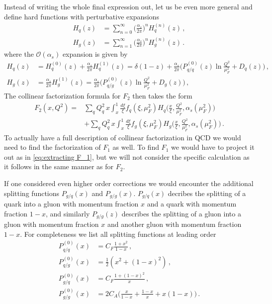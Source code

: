 Instead of writing the whole final expression out, let us be even more general and define hard functions with perturbative expansions
\begin{align}
    H_{q}(z)&=\sum_{n=0}^{\infty}\Big(\frac{\alpha_s}{2\pi}\Big)^{n}H_{q}^{(n)}(z)\,,
    \\
    H_{g}(z)&=\sum_{n=1}^{\infty}\Big(\frac{\alpha_s}{2\pi}\Big)^{n}H_{g}^{(n)}(z)\,.
\end{align}
where the $\mathcal{O}(\alpha_s)$ expansion is given by
\begin{align}
    H_{q}(z)&=H_{q}^{(0)}(z)+\frac{\alpha_s}{2\pi}H_{q}^{(1)}(z)=\delta(1-z)+\frac{\alpha_s}{2\pi}\Big(P_{q/q}^{(0)}(z)\ln{\frac{Q^{2}}{\mu_{F}^{2}}}+D_{q}(z)\Big)\,,
    \\
    H_{g}(z)&=\frac{\alpha_s}{2\pi}H_{g}^{(1)}(z)=\frac{\alpha_s}{2\pi}\Big(P_{q/g}^{(0)}(z)\ln{\frac{Q^{2}}{\mu_{F}^{2}}}+D_{g}(z)\Big)\,,
\end{align}
The collinear factorization formula for $F_2$ then takes the form
\begin{align}
    F_{2}(x,Q^{2})=&\sum_{q}Q_{q}^{2}\,x\int_{x}^{1}\frac{d\xi}{\xi}f_{q}(\xi,\mu_{F}^{2})H_{q}\big(\frac{x}{\xi},\frac{Q^{2}}{\mu_{F}^{2}},\alpha_{s}(\mu_{F}^{2})\big)\nonumber
    \\
    &+\sum_{q}Q_{q}^{2}\,x\int_{x}^{1}\frac{d\xi}{\xi}f_{g}(\xi,\mu_{F}^{2})H_{g}\big(\frac{x}{\xi},\frac{Q^{2}}{\mu_{F}^{2}},\alpha_{s}(\mu_{F}^{2})\big)\,.
\end{align}
To actually have a full description of collinear factorization in QCD we would need to find the factorization of $F_{1}$ as well. To find $F_{1}$ we would have to project it out as in \cref{eq:extracting F_1}, but we will not consider the specific calculation as it follows in the same manner as for $F_{2}$. 

\medskip
If one considered even higher order corrections we would encounter the additional splitting functions $P_{g/q}(x)$ and $P_{g/g}(x)$. $P_{g/q}(x)$ decribes the splitting of a quark into a gluon with momentum fraction $x$ and a quark with momentum fraction $1-x$, and similarly $P_{g/g}(z)$ describes the splitting of a gluon into a gluon with momentum fraction $x$ and another gluon with momentum fraction $1-x$. For completeness we list all splitting functions at leading order
\begin{align}
    P_{q/q}^{(0)}(x)&=C_{F}\frac{1+x^{2}}{1-x}\,,
    \\
    P_{q/g}^{(0)}(x)&=\frac{1}{2}(x^{2}+(1-x)^{2})\,,
    \\
    P_{g/q}^{(0)}(x)&=C_{F}\frac{1+(1-x)^{2}}{x}\,,
    \\
    P_{g/g}^{(0)}(x)&=2C_{A}\Big(\frac{x}{1-x}+\frac{1-x}{x}+x(1-x)\Big)\,.
\end{align}


